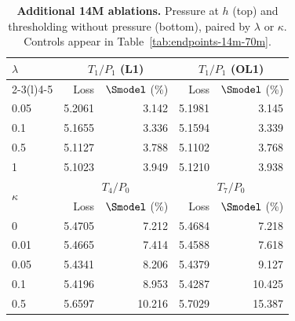 \begin{table}[!htbp]
\centering\small
\setlength{\tabcolsep}{6pt}
\renewcommand{\arraystretch}{1.05}
\caption{\textbf{Additional 14M ablations.} Pressure at $h$ (top) and thresholding without pressure (bottom), paired by $\lambda$ or $\kappa$. Controls appear in Table~\ref{tab:endpoints-14m-70m}.}
\label{tab:endpoints-14m-only}
\begin{tabular}{@{}lrrrr@{}}
\toprule
\multirow{2}{*}{$\lambda$} & \multicolumn{2}{c}{$T_1/P_1$ (L1)} & \multicolumn{2}{c}{$T_1/P_1$ (OL1)} \\
\cmidrule(lr){2-3}\cmidrule(l){4-5}
 & Loss & $\Smodel$ (\%) & Loss & $\Smodel$ (\%) \\
\midrule
0.05 & 5.2061 & 3.142 & 5.1981 & 3.145 \\
0.1 & 5.1655 & 3.336 & 5.1594 & 3.339 \\
0.5 & 5.1127 & 3.788 & 5.1102 & 3.768 \\
1 & 5.1023 & 3.949 & 5.1210 & 3.938 \\
\midrule
\multirow{2}{*}{$\kappa$} & \multicolumn{2}{c}{$T_4/P_0$} & \multicolumn{2}{c}{$T_7/P_0$} \\
\cmidrule(lr){2-3}\cmidrule(l){4-5}
 & Loss & $\Smodel$ (\%) & Loss & $\Smodel$ (\%) \\
\midrule
0 & 5.4705 & 7.212 & 5.4684 & 7.218 \\
0.01 & 5.4665 & 7.414 & 5.4588 & 7.618 \\
0.05 & 5.4341 & 8.206 & 5.4379 & 9.127 \\
0.1 & 5.4196 & 8.953 & 5.4287 & 10.425 \\
0.5 & 5.6597 & 10.216 & 5.7029 & 15.387 \\
\bottomrule
\end{tabular}
\end{table}
